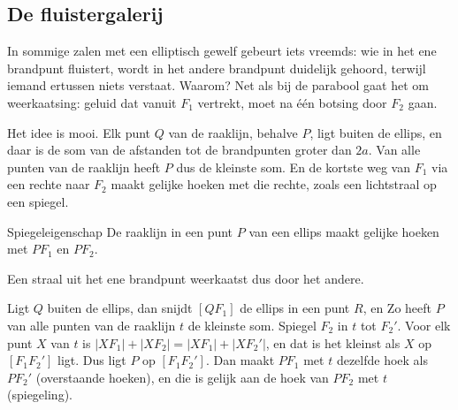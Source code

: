 \begin{oefeningen}
\end{oefeningen}

\subsection{De fluistergalerij}

In sommige zalen met een elliptisch gewelf gebeurt iets vreemds: wie in het ene brandpunt fluistert, wordt in het andere brandpunt duidelijk gehoord, terwijl iemand ertussen niets verstaat. Waarom? Net als bij de parabool gaat het om weerkaatsing: geluid dat vanuit $F_1$ vertrekt, moet na één botsing door $F_2$ gaan.

Het idee is mooi. Elk punt $Q$ van de raaklijn, behalve $P$, ligt buiten de ellips, en daar is de som van de afstanden tot de brandpunten groter dan $2a$. Van alle punten van de raaklijn heeft $P$ dus de kleinste som. En de kortste weg van $F_1$ via een rechte naar $F_2$ maakt gelijke hoeken met die rechte, zoals een lichtstraal op een spiegel.

\begin{theorie}
\begin{minipage}[t]{.6\linewidth}
\vspace{0pt}
\begin{stelling}{Spiegeleigenschap}
De raaklijn in een punt $P$ van een ellips maakt gelijke hoeken met $PF_1$ en $PF_2$.

\vspace{1mm}
Een straal uit het ene brandpunt weerkaatst dus door het andere.
\end{stelling}
\end{minipage}\hfill
\begin{minipage}[t]{.36\linewidth}
\vspace{0pt}
\centering
{}
\end{minipage}

\begin{bewijs}
Ligt $Q$ buiten de ellips, dan snijdt $[QF_1]$ de ellips in een punt $R$, en
Zo heeft $P$ van alle punten van de raaklijn $t$ de kleinste som. Spiegel $F_2$ in $t$ tot $F_2'$. Voor elk punt $X$ van $t$ is $|XF_1| + |XF_2| = |XF_1| + |XF_2'|$, en dat is het kleinst als $X$ op $[F_1F_2']$ ligt. Dus ligt $P$ op $[F_1F_2']$. Dan maakt $PF_1$ met $t$ dezelfde hoek als $PF_2'$ (overstaande hoeken), en die is gelijk aan de hoek van $PF_2$ met $t$ (spiegeling).
\end{bewijs}
\end{theorie}

